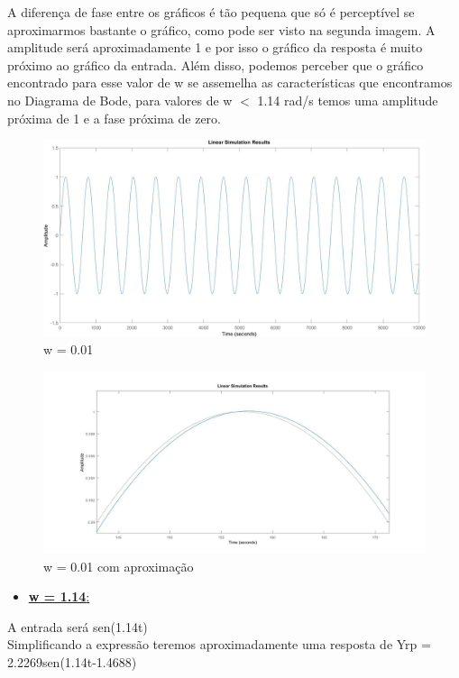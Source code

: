 \documentclass[a4paper,12pt,twoside]{article}
\begin{document}
A diferença de fase entre os gráficos é tão pequena que só é perceptível se aproximarmos bastante o gráfico, como pode ser visto na segunda imagem. A amplitude será aproximadamente 1 e por isso o gráfico da resposta é muito próximo ao gráfico da entrada. Além disso, podemos perceber que o gráfico encontrado para esse valor de w se assemelha as características que encontramos no Diagrama de Bode, para valores de w $<$ 1.14 rad/s temos uma amplitude próxima de 1 e a fase próxima de zero.

\begin{figure}[H]
\centering
\includegraphics[scale=0.2]{w001.jpg}
\caption{w = 0.01}
\label{fig:diagrama}
\end{figure}

\begin{figure}[H]
\centering
\includegraphics[scale=0.3]{001.jpg}
\caption{w = 0.01 com aproximação}
\label{fig:diagrama}
\end{figure}

\begin{itemize}
    \item \underline{\large{\textbf{w = 1.14}}:}
\end{itemize}
\noindent
A entrada será sen(1.14t)\\
Simplificando a expressão teremos aproximadamente uma resposta de Yrp = 2.2269sen(1.14t-1.4688) 
\end{document}
